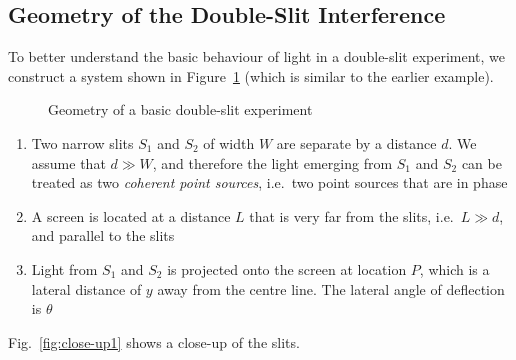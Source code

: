 \subsection{Geometry of the Double-Slit Interference}
To better understand the basic behaviour of light in a double-slit experiment,
we construct a system shown in Figure~\ref{fig:basic-2-slit} (which is similar
to the earlier example).
\begin{figure}[ht]
  \centering
  \caption{Geometry of a basic double-slit experiment}
  \label{fig:basic-2-slit}
\end{figure}
\begin{enumerate}[itemsep=4pt]%
\item Two narrow slits  $S_1$ and $S_2$ of width $W$ are separate by a distance
  $d$. We assume that $d\gg W$, and therefore the light emerging from $S_1$ and
  $S_2$ can be treated as two \emph{coherent point sources}, i.e.\ two point
  sources that are in phase
\item A screen is located at a distance $L$ that is very far from the slits,
  i.e.\ $L\gg d$, and parallel to the slits
\item Light from $S_1$ and $S_2$ is projected onto the screen at location $P$,
  which is a lateral distance of $y$ away from the centre line. The lateral
  angle of deflection is $\theta$
\end{enumerate}
Fig.~\ref{fig:close-up1} shows a close-up of the slits.
